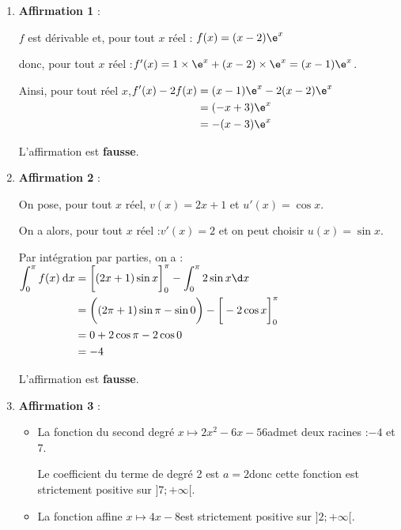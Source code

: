 \begin{enumerate}
		\item \textbf{Affirmation 1} :

		$f$ est dérivable  et, pour tout $x$ réel : \quad $f(x) = (x - 2)\e^x$

		donc, pour tout $x$ réel :\quad $f'(x)=1\times \e^x + (x-2)\times \e^x = ( x-1)\e^x$.

		Ainsi, pour tout réel $x$,\quad $\begin{aligned}[t]
		f'(x)-2f(x) & =(x-1)\e^x-2(x-2)\e^x \\
		& =(-x+3)\e^x \\
		& = -(x-3)\e^x
		\end{aligned}$

		L'affirmation est \textbf{fausse}.

		\item \textbf{Affirmation 2} :

		On pose, pour tout $x$ réel, \quad $v(x)=2x+1$ \quad et \quad $u'(x)=\cos x$.

		On a alors, pour tout $x$ réel :\quad $v'(x)=2$ \quad  et on peut choisir \quad $u(x)=\sin x$.

		Par intégration par parties, on a :\quad
		$\begin{aligned}[t]
		\displaystyle\int_0^{\pi} f(x)\:\text{d}x &= \bigg[ (2x+1) \sin x \bigg]_0^{\pi} - \displaystyle \int_0^{\pi} 2 \sin x \d x\\
		&= \bigg( (2 \pi +1) \sin \pi - \sin 0 \bigg) - \bigg[-2 \cos x \bigg]_0^{\pi} \\
		&= 0 + 2 \cos \pi -2 \cos 0 \\
		&= -4
		\end{aligned}$

		L'affirmation est \textbf{fausse}.

		\item \textbf{Affirmation 3} :

		\begin{itemize}
			\item La fonction du second degré \quad $x \longmapsto 2x^2-6x-56$\quad admet deux racines :\quad $-4$ et 7.

			Le coefficient du terme de degré 2 est \quad $a=2$\quad  donc cette fonction est strictement positive sur $]7 ; +\infty[$.

			\item La fonction affine \quad $x \longmapsto 4x-8$\quad  est strictement positive sur $]2 ;+\infty[$.
		\end{itemize}


\end{enumerate}
